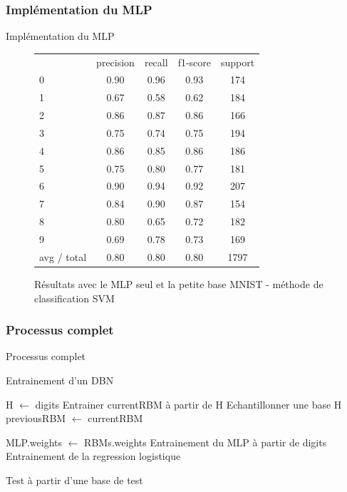 \subsubsection*{Implémentation du MLP}

\begin{frame}{Implémentation du MLP}
	\begin{figure}[ht!]
	\centering
	\begin{tabular}{l|c|c|c|c}
						 &  precision  &  recall & f1-score  & support \\
						0 &      0.90 &     0.96 &     0.93&       174 \\
						1  &     0.67  &    0.58  &    0.62 &      184\\
						2   &    0.86   &   0.87   &   0.86  &     166\\
						3    &   0.75    &  0.74    &  0.75   &    194\\
						4     &  0.86     & 0.85     & 0.86    &   186\\
						5      & 0.75      &0.80      &0.77     &  181\\
						6 &      0.90&      0.94&      0.92      & 207\\
						7  &     0.84 &     0.90  &    0.87&       154\\
						8   &    0.80  &    0.65   &   0.72 &      182\\
						9    &   0.69   &   0.78    &  0.73  &     169\\
	avg / total     &  0.80    &  0.80     & 0.80   &   1797
	\end{tabular}
	\caption{Résultats avec le MLP seul et la petite base MNIST - méthode de classification SVM}
	\end{figure} 
\end{frame}

\subsubsection{Processus complet}

\begin{frame}{Processus complet}
	\begin{algorithm}[H]
	\caption{Entrainement d'un DBN}
	\label{ProcessComplet}
		\begin{algorithmic}
			\State H $\gets$ digits
					\State Entrainer currentRBM à partir de H
						\State Echantillonner une base H
					\EndIf
				\State previousRBM $\gets$ currentRBM
			\EndFor
			
			\State MLP.weights $\gets$ RBMs.weights
			\State Entrainement du MLP à partir de digits
			\State Entrainement de la regression logistique
			
			\State Test à partir d'une base de test
		\end{algorithmic}
	\end{algorithm}
\end{frame}

